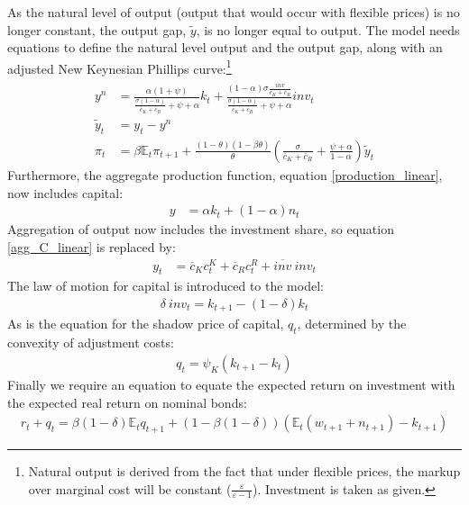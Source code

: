 \documentclass[12pt,a4paper]{article}
\begin{document}
As the natural level of output (output that would occur with flexible prices) is no longer constant, the output gap, $\tilde{y}$, is no longer equal to output. The model needs equations to define the natural level output and the output gap, along with an adjusted New Keynesian Phillips curve:\footnote{Natural output is derived from the fact that under flexible prices, the markup over marginal cost will be constant ($\frac{\varepsilon}{\varepsilon-1}$). Investment is taken as given.}
\begin{align}
y^{n} &= \frac{\alpha(1+\psi)}{\frac{\sigma (1-\alpha) }{\overline{c}_{K}+\overline{c}_{R}} + \psi+ \alpha} k_{t} +\frac{(1-\alpha) \sigma \frac{\overline{\textit{inv}}}{\overline{c}_{K}+\overline{c}_{R}}}{ \frac{\sigma (1-\alpha)}{\overline{c}_{K}+\overline{c}_{R}} + \psi + \alpha} \textit{inv}_t \label{y_nat_linear} \\
\tilde{y}_t &= y_t - y^{n}	\label{output_gap_linear} \\
\pi_t &=\beta \mathbb{E}_t\pi_{t+1}+\frac{(1-\theta)(1-\beta\theta)}{\theta}\left( \frac{\sigma}{\overline{c}_{K}+\overline{c}_{R}} +  \frac{\psi + \alpha}{1-\alpha} \right)\tilde{y}_t \label{NKphillips_linear_capital}
\end{align}
Furthermore, the aggregate production function, equation \ref{production_linear}, now includes capital:
\begin{align}
y &= \alpha k_t +  (1-\alpha)n_t  \label{production_capital_linear}
\end{align}
Aggregation of output now includes the investment share, so equation \ref{agg_C_linear} is replaced by:
\begin{align}
y_t &= \overline{c}_{K} c^K_t + \overline{c}_{R} c^R_t + \overline{\textit{inv}} \ \textit{inv}_t \label{agg_Y_linear}
\end{align}
The law of motion for capital is introduced to the model:
\begin{align}
\delta \ \textit{inv}_t = k_{t+1} - (1-\delta) k_{t}    \label{lom_capital}
\end{align}
As is the equation for the shadow price of capital, $q_t$, determined by the convexity of adjustment costs:
\begin{align}
q_t = \psi_K (k_{t+1}-k_t)	\label{shadow_K}
\end{align}
Finally we require an equation to equate the expected return on investment with the expected real return on nominal bonds:
\begin{align}
r_t + q_t = \beta (1-\delta) \mathbb{E}_t q_{t+1} + (1 - \beta (1-\delta)) (\mathbb{E}_t (w_{t+1} + n_{t+1}) - k_{t+1})	\label{return_K}
\end{align}
\end{document}
